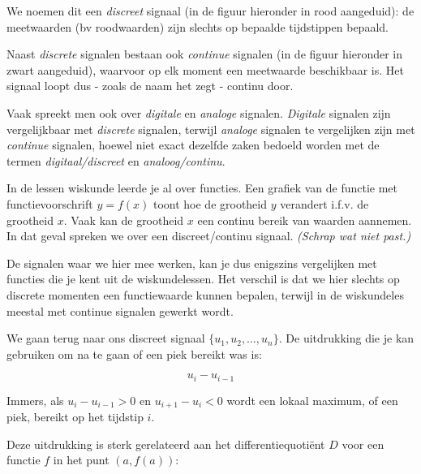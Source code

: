 \begin{opmerking}
	We noemen dit een \emph{discreet} signaal (in de figuur hieronder in rood aangeduid): de meetwaarden (bv roodwaarden) zijn slechts op bepaalde tijdstippen bepaald. 
	
	Naast \emph{discrete} signalen bestaan ook \emph{continue} signalen (in de figuur hieronder in zwart aangeduid), waarvoor op elk moment een meetwaarde beschikbaar is. Het signaal loopt dus - zoals de naam het zegt - continu door.
	
	
	Vaak spreekt men ook over \emph{digitale} en \emph{analoge} signalen. \emph{Digitale} signalen zijn vergelijkbaar met \emph{discrete} signalen, terwijl \emph{analoge} signalen te vergelijken zijn met \emph{continue} signalen, hoewel niet exact dezelfde zaken bedoeld worden met de termen \emph{digitaal/discreet} en \emph{analoog/continu}.

\end{opmerking}

\begin{oef}
	In de lessen wiskunde leerde je al over functies. Een grafiek van de functie met functievoorschrift $y=f(x)$ toont hoe de grootheid $y$ verandert i.f.v. de grootheid $x$. Vaak kan de grootheid $x$ een continu bereik van waarden aannemen. In dat geval spreken we over een discreet/continu signaal. \emph{(Schrap wat niet past.)}
\end{oef}

De signalen waar we hier mee werken, kan je dus enigszins vergelijken met functies die je kent uit de wiskundelessen. 
Het verschil is dat we hier slechts op discrete momenten een functiewaarde kunnen bepalen, terwijl in de wiskundeles meestal met continue signalen gewerkt wordt.

We gaan terug naar ons discreet signaal $\{ u_1, u_2, \ldots, u_n\}$. De uitdrukking die je kan gebruiken om na te gaan of een piek bereikt was is:

\begin{equation*}
u_i-u_{i-1}
\end{equation*}

Immers, als $u_{i}-u_{i-1}>0$ en $u_{i+1}-u_{i}<0$ wordt een lokaal maximum, of een piek, bereikt op het tijdstip $i$.

Deze uitdrukking is sterk gerelateerd aan het differentiequoti\"ent $D$ voor een functie $f$ in het punt $(a,f(a))$:

